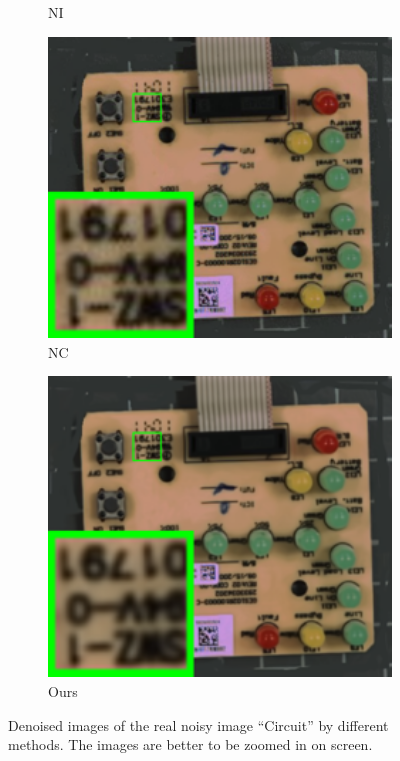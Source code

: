 \begin{figure}
\begin{subfigure}[t]{0.19\textwidth}
\caption{NI}
    \end{subfigure}
    \hfill
    \begin{subfigure}[t]{0.19\textwidth}
        \centering
        \includegraphics[width=1\textwidth]{images/guided/nc/resize_br_NC_circuit.png}
\caption{NC}
    \end{subfigure}
    \hfill
    \begin{subfigure}[t]{0.19\textwidth}
        \centering
        \includegraphics[width=1\textwidth]{images/guided/nc/resize_br_Guided_circuit.png}
\caption{Ours}
    \end{subfigure}
    \caption{Denoised images of the real noisy image ``Circuit'' \cite{ncwebsite} by different methods. The images are better to be zoomed in on screen.}
    \label{fig3-11}
\end{figure}

